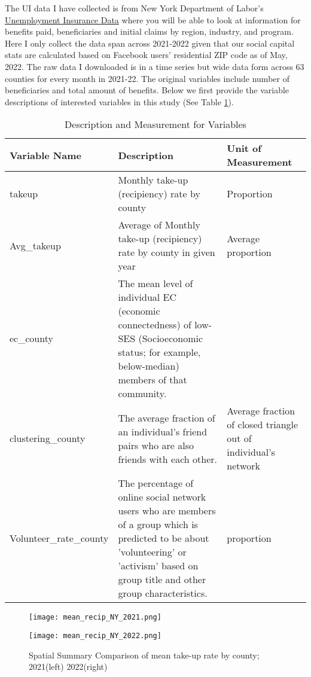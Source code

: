 \documentclass{article}
\begin{document}
The UI data I have collected is from New York Department of Labor's \href{https://dol.ny.gov/local-area-unemployment-statistics}{Unemployment Insurance Data} where you will be able to look at information for benefits paid, beneficiaries and initial claims by region, industry, and program. Here I only collect the data span across 2021-2022 given that our social capital stats are calculated based on Facebook users' residential ZIP code as of May, 2022. The raw data I downloaded is in a time series but wide data form across 63 counties for every month in 2021-22. The original variables include number of beneficiaries and total amount of benefits. Below we first provide the variable descriptions of interested variables in this study (See Table \ref{variable descr}).



\begin{table}[h]
\centering
\begin{tabular}{|p{3.2cm}|p{8cm}|p{4cm}|}
\hline
\textbf{Variable Name} & \textbf{Description} & \textbf{ Unit of Measurement} \\ \hline
takeup & Monthly take-up (recipiency) rate by county & Proportion  \\ \hline
Avg\_takeup & Average of Monthly take-up (recipiency) rate by county in given year & Average proportion \\ \hline
ec\_county & The mean level of individual EC (economic connectedness) of low-SES (Socioeconomic status; for example, below-median) members of that community. &  \\ \hline
clustering\_county & The average fraction of an individual's friend pairs who are also friends with each other. & Average fraction of closed triangle out of individual's network \\ \hline
Volunteer\_rate\_county & The percentage of online social network users who are members of a group which is predicted to be about 'volunteering' or 'activism' based on group title and other group characteristics. & proportion \\ \hline
\end{tabular}
\caption{Description and Measurement for Variables}
\label{variable descr}
\end{table}


\begin{figure}[h]
\begin{minipage}{0.5\textwidth}
    \centering
    \texttt{[image: mean\_recip\_NY\_2021.png]} %
  \end{minipage}\hfill
  \begin{minipage}{0.5\textwidth}
    \centering
    \texttt{[image: mean\_recip\_NY\_2022.png]} %
  \end{minipage}
  \caption{Spatial Summary Comparison of mean take-up rate by county; 2021(left) 2022(right)}
  \label{take-up figure}
\end{figure}
\end{document}
